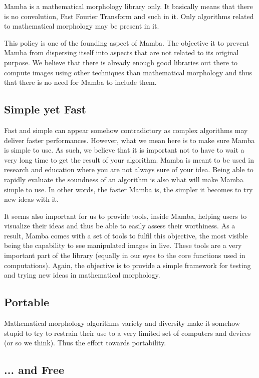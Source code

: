 \documentclass[a4paper,10pt,oneside]{article}
\begin{document}
Mamba is a mathematical morphology library only. It basically means
that there is no convolution, Fast Fourier Transform and such in it.
Only algorithms related to mathematical morphology may be present
in it.

This policy is one of the founding aspect of Mamba. The objective
it to prevent Mamba from dispersing itself into aspects that are not
related to its original purpose. We believe that there is already
enough good libraries out there to compute images using other techniques
than mathematical morphology and thus that there is no need for Mamba
to include them.


\subsection{Simple yet Fast}

Fast and simple can appear somehow contradictory as complex algorithms
may deliver faster performances. However, what we mean here is to
make sure Mamba is simple to use. As such, we believe that it is important
not to have to wait a very long time to get the result of your algorithm.
Mamba is meant to be used in research and education where you are
not always sure of your idea. Being able to rapidly evaluate the soundness
of an algorithm is also what will make Mamba simple to use. In other
words, the faster Mamba is, the simpler it becomes to try new ideas
with it.

It seems also important for us to provide tools, inside Mamba, helping
users to \textquotedbl{}visualize\textquotedbl{} their ideas and thus
be able to easily assess their worthiness. As a result, Mamba comes
with a set of tools to fulfil this objective, the most visible being
the capability to see manipulated images in live. These tools are
a very important part of the library (equally in our eyes to the core
functions used in computations). Again, the objective is to provide
a simple framework for testing and trying new ideas in mathematical
morphology.


\subsection{Portable}

Mathematical morphology algorithms variety and diversity make it somehow
stupid to try to restrain their use to a very limited set of computers
and devices (or so we think). Thus the effort towards portability.


\subsection{... and Free}
\end{document}
